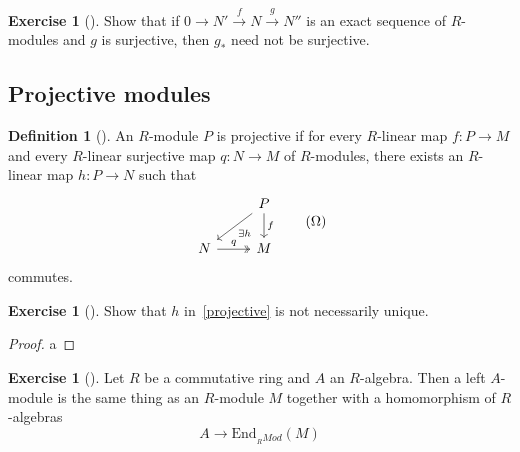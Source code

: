 \documentclass[reqno]{amsart}
\theoremstyle{definition}
\newtheorem{definition}[theorem]{Definition}
\newtheorem{exercise}[theorem]{Exercise}
\theoremstyle{remark}
\newcommand{\End}{{\mathrm{End}}}
\begin{document}
        \newpage




        \begin{exercise}[]
            Show that if $0 \to N' \stackrel{f}{\to} N 
            \stackrel{g}{\to} N''$ is an exact sequence
            of $R$-modules and $g$ is surjective, then
            $g_*$ need not be surjective.
        \end{exercise}


        \subsection{Projective modules}

        \begin{definition}[]
            An $R$-module $P$ is projective if for
            every $R$-linear map $f \colon P \to M$ and
            every $R$-linear surjective map $q \colon N \to M$ 
            of $R$-modules, there exists
            an $R$-linear map $h \colon P \to N$ such that
            \begin{equation*}\label{projective}
            \begin{tikzcd}
                & P \ar[dl, "\exists h"] \ar[d, "f"] \\
                N \ar[r, "q", twoheadrightarrow] & M
            \end{tikzcd} \tag{$\Omega$}
            \end{equation*}
            commutes.
        \end{definition}

        \begin{exercise}[]
            Show that $h$ in~\eqref{projective}
            is not necessarily unique.
        \end{exercise}

        \begin{proof}
            a
        \end{proof}
        



        \begin{exercise}[]
            Let $R$ be a commutative ring and
            $A$ an $R$-algebra. Then a left
            $A$-module is the same thing as an
            $R$-module $M$ together with a homomorphism
            of $R$-algebras
            \[
            A \to \End_{_R Mod}(M)
            \] 
        \end{exercise}



\end{document}
